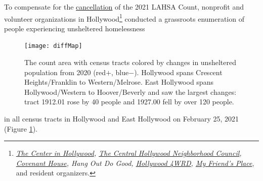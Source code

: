 \documentclass[11pt]{article}
\begin{document}
 To compensate for the \href{https://laist.com/latest/post/20201209/LAHSA-cancels-2021-homeless-count-los-angeles-covid-19}
{cancellation} of the 2021 LAHSA Count, nonprofit and volunteer organizations in Hollywood\footnote{
{\it \href{https://thecenterinhollywood.org}
{The Center in Hollywood}, \href{https://chnc.org}{The Central Hollywood Neighborhood Council}, 
\href{https://www.covenanthouse.org/spring-meal-match?sourceid=2483460&origin=DHQEI2109EZI0N&utm_source=2103marchmealmatchweb&utm_medium=cpc&utm_campaign=FY21MarchMealMatch&utm_content=bsd2103marchmealmatchweb&gclid=CjwKCAiAp4KCBhB6EiwAxRxbpJA2yM7lM2tyAqjVALZgBGvjnhobCJJ0XmuELFDXzM5xxZ0BqyX1ChoCLi0QAvD_BwE}{Covenant House}, 
Hang Out Do Good, \href{https://hollywood4wrd.live}{Hollywood 4WRD}, 
 \href{https://www.myfriendsplace.org/}{My Friend's Place}}, and resident organizers.} conducted a
grassroots enumeration of people experiencing unsheltered homelessness%
\begin{figure}
	\centering
	\texttt{[image: diffMap]}
	\caption{The count area with census tracts colored by  
			changes in unsheltered population from 2020 (red$+$, blue$-$).
			Hollywood spans Crescent Heights/Franklin to Western/Melrose. East Hollywood 
			spans Hollywood/Western to Hoover/Beverly and saw the largest changes:
			tract 1912.01 rose by 40 people and 1927.00 fell by over 120 people.}
	\label{fig:tcomp}
\end{figure} in all
census tracts in Hollywood and East Hollywood on February 25, 2021 (Figure \ref{fig:tcomp}).\\

%
\end{document}
